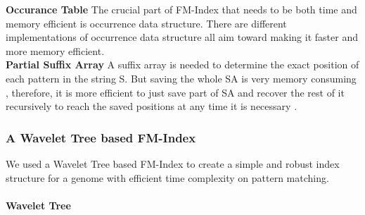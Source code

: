 \documentclass[11pt,a4paper]{report}
\begin{document}
\textbf{Occurance Table} The crucial part of FM-Index that needs to be 
both time and memory efficient is occurrence data structure\cite{Wavthesis}.
There are different implementations of occurrence data structure all aim toward making it faster and more memory efficient.
\\

\textbf{Partial Suffix Array} A suffix array is needed to determine the exact position of each pattern in the string S.
But saving the whole SA is very memory consuming , therefore,
it is more efficient to just save part of SA and recover the rest
of it recursively to reach the saved positions at any time it is necessary \cite{Wavthesis}.\\



\subsubsection{A Wavelet Tree based FM-Index} \label{A Wavelet Tree based FM-Index}

We used a Wavelet Tree based FM-Index to create a simple and robust index structure for 
a genome with efficient time complexity on pattern matching.\\
\paragraph{Wavelet Tree}
\end{document}
